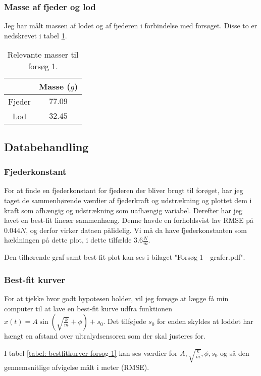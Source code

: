 \subsubsection{Masse af fjeder og lod}\label{exp1: Masse af fjeder og lod}
Jeg har målt massen af lodet og af fjederen i forbindelse med forsøget. 
Disse to er nedskrevet i tabel \ref{tabel: Masser forsog 1}.
\begin{table}[h]
\centering
\begin{tabular}{|c|c|}
\hline 
 & Masse ($g$) \\ 
\hline 
Fjeder & $77.09$ \\ 
\hline 
Lod & $32.45$ \\ 
\hline 
\end{tabular} 
\caption{Relevante masser til forsøg 1.}
\label{tabel: Masser forsog 1}
\end{table}

\subsection{Databehandling}\label{exp1: databehandling afsnit}
\subsubsection{Fjederkonstant}\label{databehandling: tyk fjeder fjederkonstant}
For at finde en fjederkonstant for fjederen der bliver brugt til forøget, har jeg taget de sammenhørende værdier af fjederkraft og udstrækning og plottet dem i kraft som afhængig og udstrækning som uafhængig variabel. 
Derefter har jeg lavet en best-fit lineær sammenhæng. 
Denne havde en forholdsvist lav RMSE på $0.044N$, og derfor virker dataen pålidelig. 
Vi må da have fjederkonstanten som hældningen på dette plot, i dette tilfælde $3.6\frac{N}{m}$.

Den tilhørende graf samt best-fit plot kan ses i bilaget "Forsøg 1 - grafer.pdf". 
 

\subsubsection{Best-fit kurver}\label{exp1: Best-fit kurver}
For at tjekke hvor godt hypotesen holder, vil jeg forsøge at lægge få min computer til at lave en best-fit kurve udfra funktionen $x(t)=A\sin (\sqrt{\frac{k}{m}}+\phi) + s_0$.
Det tilføjede $s_0$ for enden skyldes at loddet har hængt en afstand over ultralydsensoren som der skal justeres for. 

I tabel \ref{tabel: bestfitkurver forsog 1} kan ses værdier for $A, \sqrt{\frac{k}{m}}, \phi ,s_0$ og så den gennemsnitlige afvigelse målt i meter (RMSE).



